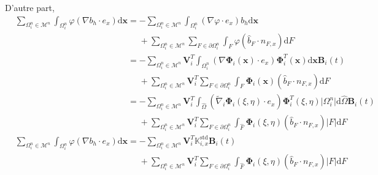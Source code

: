\documentclass[11pt, a4paper, oneside]{report}
\begin{document}
\noindent
D'autre part,
\begin{equation}
    \begin{aligned}
        & \sum_{\Omega_i^n \in \mathcal{M}^n} \int_{\Omega_i^n} \varphi (\nabla b_h \cdot e_x) \text{d}\bm{x} = - \sum_{\Omega_i^n \in \mathcal{M}^n} \int_{\Omega_i^n} (\nabla \varphi \cdot e_x) b_h \text{d}\bm{x} \\
        & \phantom{\sum_{\Omega_i^n \in \mathcal{M}^n} \int_{\Omega_i^n} \varphi (\nabla b_h \cdot e_x) \text{d}\bm{x} = } + \sum_{\Omega_i^n \in \mathcal{M}^n} \sum_{F \in \partial \Omega_i^n} \int_{F} \varphi \left( \widehat{b}_F \cdot n_{F, x} \right) \text{d}F \\
        & \phantom{\sum_{\Omega_i^n \in \mathcal{M}^n} \int_{\Omega_i^n} \varphi (\nabla b_h \cdot e_x) \text{d}\bm{x}} = - \sum_{\Omega_i^n \in \mathcal{M}^n} \bm{V}_i^T \int_{\Omega_i^n} \left( \nabla \bm{\Phi}_i(\bm{x}) \cdot e_x \right) \bm{\Phi}_i^T(\bm{x}) \text{d}\bm{x} \bm{B}_i(t) \\
        & \phantom{\sum_{\Omega_i^n \in \mathcal{M}^n} \int_{\Omega_i^n} \varphi (\nabla b_h \cdot e_x) \text{d}\bm{x} = } + \sum_{\Omega_i^n \in \mathcal{M}^n} \bm{V}_i^T \sum_{F \in \partial \Omega_i^n} \int_{F} \bm{\Phi}_i(\bm{x}) \left( \widehat{b}_F \cdot n_{F, x} \right) \text{d}F \\
        & \phantom{\sum_{\Omega_i^n \in \mathcal{M}^n} \int_{\Omega_i^n} \varphi (\nabla b_h \cdot e_x) \text{d}\bm{x}} = - \sum_{\Omega_i^n \in \mathcal{M}^n} \bm{V}_i^T \int_{\widehat{\Omega}} \left( \widetilde{\nabla}_i \bm{\Phi}_i(\xi, \eta) \cdot e_x \right) \bm{\Phi}_i^T(\xi, \eta) \lvert \Omega_i^n \rvert \text{d} \widehat{\Omega} \bm{B}_i(t) \\
        & \phantom{ \sum_{\Omega_i^n \in \mathcal{M}^n} \int_{\Omega_i^n} \varphi (\nabla b_h \cdot e_x) \text{d}\bm{x} = } + \sum_{\Omega_i^n \in \mathcal{M}^n} \bm{V}_i^T \sum_{F \in \partial \Omega_i^n} \int_{\widehat{F}} \bm{\Phi}_i(\xi, \eta) \left( \widehat{b}_F \cdot n_{F, x} \right) \lvert F \rvert \text{d}F \\
        & \sum_{\Omega_i^n \in \mathcal{M}^n} \int_{\Omega_i^n} \varphi (\nabla b_h \cdot e_x) \text{d}\bm{x} = - \sum_{\Omega_i^n \in \mathcal{M}^n} \bm{V}_i^T \mathbb{K}_{i, x}^\text{std} \bm{B}_i(t) \\
        & \phantom{ \sum_{\Omega_i^n \in \mathcal{M}^n} \int_{\Omega_i^n} \varphi (\nabla b_h \cdot e_x) \text{d}\bm{x} = } + \sum_{\Omega_i^n \in \mathcal{M}^n} \bm{V}_i^T \sum_{F \in \partial \Omega_i^n} \int_{\widehat{F}} \bm{\Phi}_i(\xi, \eta) \left( \widehat{b}_F \cdot n_{F, x} \right) \lvert F \rvert \text{d}F
    \end{aligned}
\end{equation}
\end{document}
